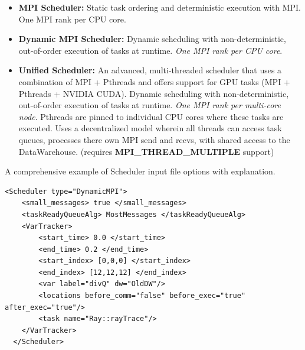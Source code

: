 \begin{itemize}
  \item \textbf{MPI Scheduler:} Static task ordering and deterministic
      execution with MPI. One MPI rank per CPU core.
  \item \textbf{Dynamic MPI Scheduler:} Dynamic scheduling with
      non-deterministic, out-of-order execution of tasks at runtime.
      \emph{One MPI rank per CPU core}.
  \item \textbf{Unified Scheduler:} An advanced, multi-threaded
      scheduler that uses a combination of MPI + Pthreads and offers support
      for GPU tasks (MPI + Pthreads + NVIDIA CUDA). Dynamic scheduling with non-deterministic, out-of-order execution of tasks at runtime. \emph{One MPI
      rank per multi-core node}. Pthreads are pinned to individual CPU cores where these tasks are executed. Uses a decentralized model wherein all threads can access task queues, processes there own MPI send and recvs, with shared
      access to the DataWarehouse. (requires \textbf{MPI\_THREAD\_MULTIPLE}
      support)
\end{itemize}

\noindent A comprehensive example of Scheduler input file options with
explanation.

\begin{Verbatim}[fontsize=\footnotesize]
  <Scheduler type="DynamicMPI">
    <small_messages> true </small_messages>
    <taskReadyQueueAlg> MostMessages </taskReadyQueueAlg>
    <VarTracker>
        <start_time> 0.0 </start_time>
        <end_time> 0.2 </end_time>
        <start_index> [0,0,0] </start_index>
        <end_index> [12,12,12] </end_index>
        <var label="divQ" dw="OldDW"/>
        <locations before_comm="false" before_exec="true" after_exec="true"/>
        <task name="Ray::rayTrace"/>
    </VarTracker>
  </Scheduler>
\end{Verbatim}

